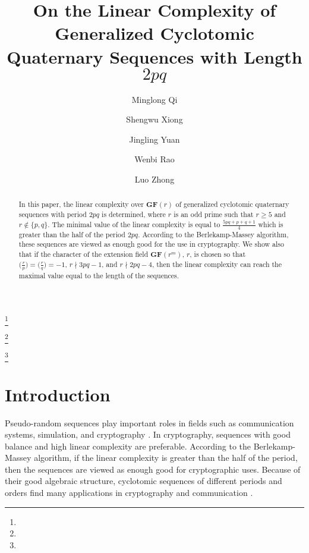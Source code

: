 \documentclass{mcom-l}
\theoremstyle{definition}
\numberwithin{equation}{section}
\begin{document}
\title[Linear Complexity of Generalized Cyclotomic Quaternary Sequences ]{On the Linear Complexity of Generalized Cyclotomic Quaternary Sequences with Length $ 2pq $}


\author{Minglong Qi}
\address{School of Computer Science and Technology, Wuhan University of Technology, Mafangshan West Campus, 430070 Wuhan City, China}
\curraddr{}


\author{Shengwu Xiong}
\address{}
\curraddr{}
\email{}


\author{Jingling Yuan}
\address{}
\curraddr{}
\email{}
\thanks{}

\author{Wenbi Rao}
\address{}
\curraddr{}
\email{}
\thanks{}

\author{Luo Zhong}
\address{}
\curraddr{}
\email{}
\thanks{}





\begin{abstract}
In this paper, the linear complexity over $ \mathbf{GF}(r) $   of   generalized cyclotomic quaternary sequences with period $ 2pq $  is determined, where $ r $ is an odd prime such that $ r \ge 5 $ and $ r\notin \lbrace p,q\rbrace $. The minimal value of the linear complexity  is equal to $ \tfrac{5pq+p+q+1}{4} $ which is greater than  the half of the period $ 2pq $. According to the Berlekamp-Massey algorithm, these sequences are viewed as enough good for the use in cryptography. We show also that if the character of the extension field $ \mathbf{GF}(r^{m}) $, $ r $, is chosen so that  $\bigl(\tfrac{r}{p}\bigr)=\bigl(\tfrac{r}{q}\bigr)=-1 $, $ r\nmid 3pq-1 $, and $ r\nmid 2pq-4 $, then the linear complexity can reach the maximal value equal to the length of the sequences.
\end{abstract}
\maketitle
\section{Introduction}
\label{sec1}
Pseudo-random sequences play important roles in fields such as communication systems, simulation, and cryptography \cite{B1,B2}. In  cryptography, sequences with good balance and high linear complexity are preferable\cite{B2,B3,B4}. According to the Berlekamp-Massey algorithm\cite{B5}, if the linear complexity is greater than the half of the period, then the sequences are viewed as enough good for cryptographic uses. Because of their  good algebraic structure\cite{B6,B8}, cyclotomic sequences of different periods and orders find many applications in cryptography and communication \cite{B4,B7,B8,B9,B10}.
\end{document}
